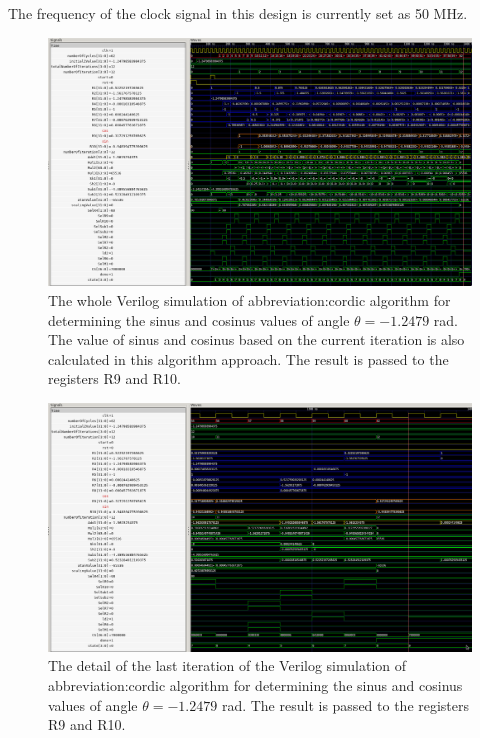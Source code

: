 \documentclass[a4paper, twoside, 11pt]{article}
\begin{document}
    The frequency of the clock signal in this design is currently set as 50 MHz.

        \begin{figure}[htbp!]
            \centering
            \includegraphics[width=1\textwidth]{src/png/cordic-verilog-whole-sim.png}
            \caption{The whole Verilog simulation of \gls{abbreviation:cordic} algorithm for determining the sinus and cosinus values of angle $\theta = -1.2479$ rad. The value of sinus and cosinus based on the current iteration is also calculated in this algorithm approach. The result is passed to the registers R9 and R10.}
            \label{fig:cordic-verilog-whole-sim}
        \end{figure}

        \begin{figure}[htbp!]
            \centering
            \includegraphics[width=1\textwidth]{src/png/cordic-verilog-end-of-the-simulation.png}
            \caption{The detail of the last iteration of the Verilog simulation of \gls{abbreviation:cordic} algorithm for determining the sinus and cosinus values of angle $\theta = -1.2479$ rad. The result is passed to the registers R9 and R10.}
            \label{fig:cordic-verilog-end-of-the-simulation}
        \end{figure}
\end{document}
